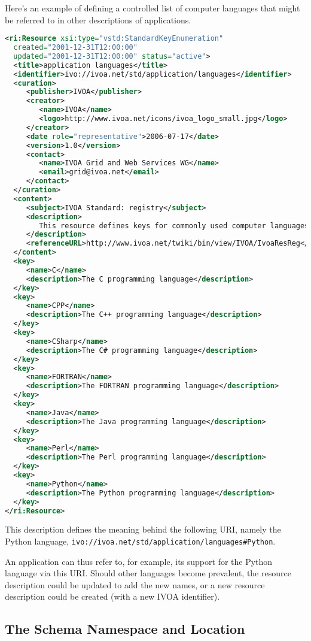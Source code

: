 \documentclass[11pt,a4paper]{ivoa}
\begin{document}
Here's an example of defining a controlled list of computer languages
that might be referred to in other descriptions of applications.

\begin{lstlisting}[language=xml]
<ri:Resource xsi:type="vstd:StandardKeyEnumeration"
  created="2001-12-31T12:00:00"
  updated="2001-12-31T12:00:00" status="active">
  <title>application languages</title>
  <identifier>ivo://ivoa.net/std/application/languages</identifier>
  <curation>
     <publisher>IVOA</publisher>
     <creator>
        <name>IVOA</name>
        <logo>http://www.ivoa.net/icons/ivoa_logo_small.jpg</logo>
     </creator>
     <date role="representative">2006-07-17</date>
     <version>1.0</version>
     <contact>
        <name>IVOA Grid and Web Services WG</name>
        <email>grid@ivoa.net</email>
     </contact>
  </curation>
  <content>
     <subject>IVOA Standard: registry</subject>
     <description>
        This resource defines keys for commonly used computer languages.
     </description>
     <referenceURL>http://www.ivoa.net/twiki/bin/view/IVOA/IvoaResReg</referenceURL>
  </content>
  <key>
     <name>C</name>
     <description>The C programming language</description>
  </key>
  <key>
     <name>CPP</name>
     <description>The C++ programming language</description>
  </key>
  <key>
     <name>CSharp</name>
     <description>The C# programming language</description>
  </key>
  <key>
     <name>FORTRAN</name>
     <description>The FORTRAN programming language</description>
  </key>
  <key>
     <name>Java</name>
     <description>The Java programming language</description>
  </key>
  <key>
     <name>Perl</name>
     <description>The Perl programming language</description>
  </key>
  <key>
     <name>Python</name>
     <description>The Python programming language</description>
  </key>
</ri:Resource>
\end{lstlisting}


This description defines the meaning behind the following URI, namely
the Python language,
\nolinkurl{ivo://ivoa.net/std/application/languages#Python}.

An application can thus refer to, for example, its support for the
Python language via this URI.  Should other languages become
prevalent, the resource description could be updated to add the new
names, or a new resource description could be created (with a new IVOA
identifier).



\subsection{The Schema Namespace and Location}
\end{document}
